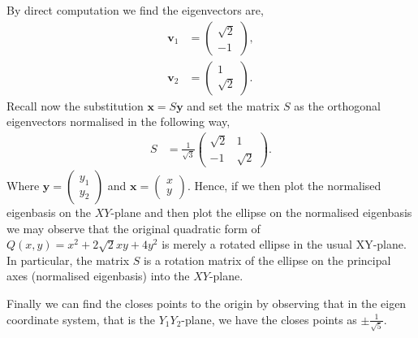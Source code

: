 \begin{exmp}
  By direct computation we find the eigenvectors are,
  \begin{align*}
   \mathbf{v}_1 &= \begin{pmatrix} \sqrt{2} \\ -1 \end{pmatrix},
   \\
   \mathbf{v}_2 &= \begin{pmatrix} 1 \\ \sqrt{2} \end{pmatrix}.
  \end{align*}
  Recall now the substitution $\mathbf{x} = S \mathbf{y}$ and set the matrix
  $S$ as the orthogonal eigenvectors normalised in the following way,
  \begin{align*}
   S &= \frac{1}{\sqrt{3}}
   \begin{pmatrix}
    \sqrt{2} & 1 \\
    -1 & \sqrt{2}
   \end{pmatrix}.
  \end{align*}
  Where $\mathbf{y} = \begin{pmatrix} y_1 \\ y_2 \end{pmatrix}$ and
  $\mathbf{x} = \begin{pmatrix} x \\ y \end{pmatrix}$. Hence, if we then
  plot the normalised eigenbasis on the $XY$-plane and then plot the ellipse
  on the normalised eigenbasis we may observe that the original quadratic form of
  $Q(x,y) = x^2 + 2 \sqrt{2} xy + 4y^2$ is merely a rotated ellipse in the usual XY-plane.
  In particular, the matrix $S$ is a rotation matrix of the ellipse on the principal axes
  (normalised eigenbasis) into the $XY$-plane.

  Finally we can find the closes points to the origin by observing that in the eigen
  coordinate system, that is the $Y_1 Y_2$-plane, we have the closes points as
  $\pm \frac{1}{\sqrt{5}}$.
\end{exmp}


